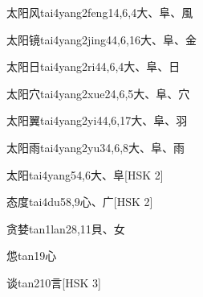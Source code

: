 \begin{entry}{太阳风}{tai4yang2feng1}{4,6,4}{⼤、⾩、⾵}
\end{entry}

\begin{entry}{太阳镜}{tai4yang2jing4}{4,6,16}{⼤、⾩、⾦}
\end{entry}

\begin{entry}{太阳日}{tai4yang2ri4}{4,6,4}{⼤、⾩、⽇}
\end{entry}

\begin{entry}{太阳穴}{tai4yang2xue2}{4,6,5}{⼤、⾩、⽳}
\end{entry}

\begin{entry}{太阳翼}{tai4yang2yi4}{4,6,17}{⼤、⾩、⽻}
\end{entry}

\begin{entry}{太阳雨}{tai4yang2yu3}{4,6,8}{⼤、⾩、⾬}
\end{entry}

\begin{entry}{太阳}{tai4yang5}{4,6}{⼤、⾩}[HSK 2]
\end{entry}

\begin{entry}{态度}{tai4du5}{8,9}{⼼、⼴}[HSK 2]
\end{entry}

\begin{entry}{贪婪}{tan1lan2}{8,11}{⾙、⼥}
\end{entry}

\begin{entry}{怹}{tan1}{9}{⼼}
\end{entry}

\begin{entry}{谈}{tan2}{10}{⾔}[HSK 3]
\end{entry}

